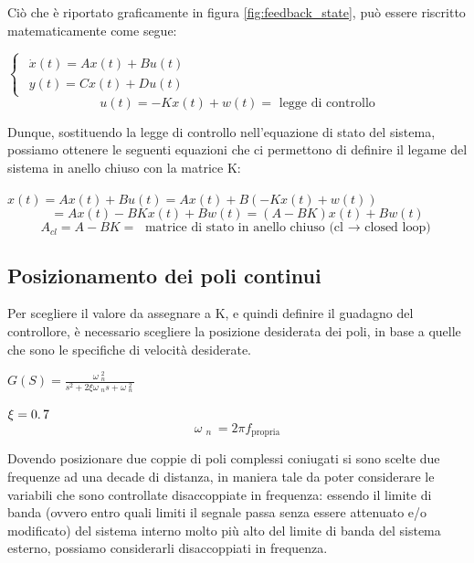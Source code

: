 Ciò che è riportato graficamente in figura \ref{fig:feedback_state}, può essere riscritto matematicamente come segue:
\begin{center}
	$
	\begin{cases}
	\begin{array}{c}
	\dot{x}\left(t\right)=Ax{\left(t\right)}+Bu\left(t\right)\\
	y{\left(t\right)}=Cx{\left(t\right)}+Du\left(t\right)
	\end{array}
	\end{cases}
	$
	$$
	u{\left(t\right)}=-Kx{\left(t\right)}+w{\left(t\right)}	= \text{ legge di controllo}
	$$
\end{center}

\newpage
Dunque, sostituendo la legge di controllo nell'equazione di stato del sistema, possiamo ottenere le seguenti equazioni che ci permettono di definire il legame del sistema in anello chiuso con la matrice K:
\begin{center}
	$
	x{\left(t\right)}=Ax{\left(t\right)}+Bu{\left(t\right)}=Ax{\left(t\right)}+B{\left(-Kx{\left(t\right)}+w{\left(t\right)}\right)}
	$
	$$
	=Ax{\left(t\right)}-BKx{\left(t\right)}+Bw\left(t\right)={\left(A-BK\right)}x{\left(t\right)}+Bw{\left(t\right)}
	$$
	$$
	A_{cl} =A-BK = \text{ matrice di stato in anello chiuso (cl $\rightarrow$ closed loop)}
	$$
\end{center}

\subsection{Posizionamento dei poli continui}
Per scegliere il valore da assegnare a K, e quindi definire il guadagno del controllore, è necessario scegliere la posizione desiderata dei poli, in base a quelle che sono le specifiche di velocità desiderate.

\begin{center}
	$
	G{\left(S\right)}=\frac{\omega {\;}_n^{2\;} }{s^2 +2\xi \omega {\;}_n s+\omega {\;}_n^{2\;} }
	$
\end{center}

\begin{center}
	$
	\xi =0\ldotp 7
	$
	$$
	\omega {\;}_{n\;}=2 \pi f_{\mathrm{propria}}
	$$
\end{center}

Dovendo posizionare due coppie di poli complessi coniugati si sono scelte due frequenze ad una decade di distanza, in maniera tale da poter considerare le variabili che sono controllate disaccoppiate in frequenza: essendo il limite di banda (ovvero entro quali limiti il segnale passa senza essere attenuato e/o modificato) del sistema interno molto più alto del limite di banda del sistema esterno, possiamo considerarli disaccoppiati in frequenza.

